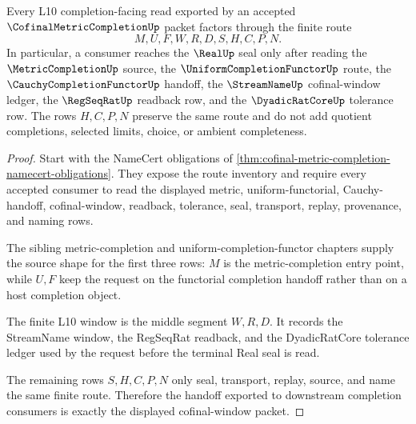 \begin{theorem}
\label{thm:cofinal-metric-completion-l10-handoff}
Every L10 completion-facing read exported by an accepted $\CofinalMetricCompletionUp$ packet factors through the finite route
$$
M,U,F,W,R,D,S,H,C,P,N.
$$
In particular, a consumer reaches the $\RealUp$ seal only after reading the $\MetricCompletionUp$ source, the $\UniformCompletionFunctorUp$ route, the $\CauchyCompletionFunctorUp$ handoff, the $\StreamNameUp$ cofinal-window ledger, the $\RegSeqRatUp$ readback row, and the $\DyadicRatCoreUp$ tolerance row. The rows $H,C,P,N$ preserve the same route and do not add quotient completions, selected limits, choice, or ambient completeness.
\end{theorem}
\begin{proof}
Start with the NameCert obligations of \autoref{thm:cofinal-metric-completion-namecert-obligations}. They expose the route inventory and require every accepted consumer to read the displayed metric, uniform-functorial, Cauchy-handoff, cofinal-window, readback, tolerance, seal, transport, replay, provenance, and naming rows.

The sibling metric-completion and uniform-completion-functor chapters supply the source shape for the first three rows: $M$ is the metric-completion entry point, while $U,F$ keep the request on the functorial completion handoff rather than on a host completion object.

The finite L10 window is the middle segment $W,R,D$. It records the StreamName window, the RegSeqRat readback, and the DyadicRatCore tolerance ledger used by the request before the terminal Real seal is read.

The remaining rows $S,H,C,P,N$ only seal, transport, replay, source, and name the same finite route. Therefore the handoff exported to downstream completion consumers is exactly the displayed cofinal-window packet.
\end{proof}


